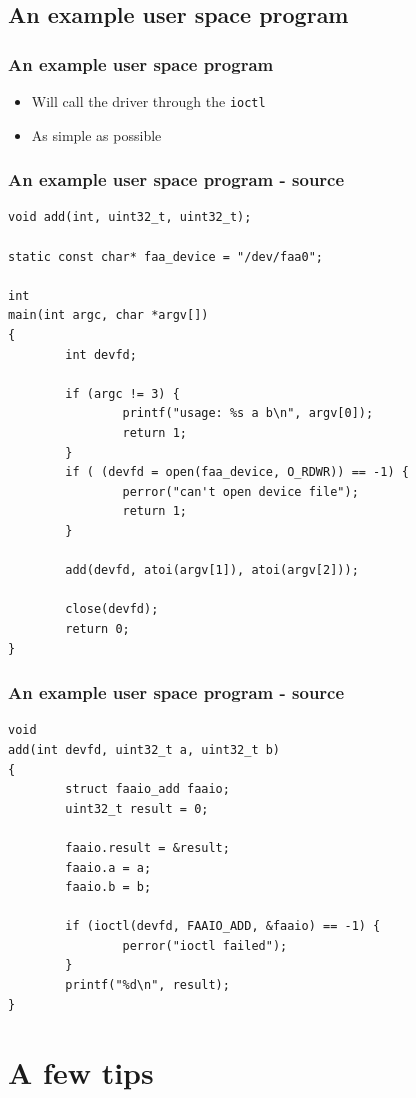 \documentclass[dvipsnames,table]{beamer}
\begin{document}
\subsection{An example user space program}

\begin{frame}
\frametitle{An example user space program}
\begin{itemize}
	\item Will call the driver through the {\tt ioctl}
	\item As simple as possible
\end{itemize}
\end{frame}

\begin{frame}[fragile]
\frametitle{An example user space program - source}
\begin{lstlisting}
void add(int, uint32_t, uint32_t);

static const char* faa_device = "/dev/faa0";

int
main(int argc, char *argv[])
{
        int devfd;

        if (argc != 3) {
                printf("usage: %s a b\n", argv[0]);
                return 1;
        }
        if ( (devfd = open(faa_device, O_RDWR)) == -1) {
                perror("can't open device file");
                return 1;
        }

        add(devfd, atoi(argv[1]), atoi(argv[2]));

        close(devfd);
        return 0;
}
\end{lstlisting}
\end{frame}

\begin{frame}[fragile]
\frametitle{An example user space program - source}
\begin{lstlisting}
void
add(int devfd, uint32_t a, uint32_t b)
{
        struct faaio_add faaio;
        uint32_t result = 0;

        faaio.result = &result;
        faaio.a = a;
        faaio.b = b;

        if (ioctl(devfd, FAAIO_ADD, &faaio) == -1) {
                perror("ioctl failed");
        }
        printf("%d\n", result);
}
\end{lstlisting}
\end{frame}

\section{A few tips}
\end{document}

